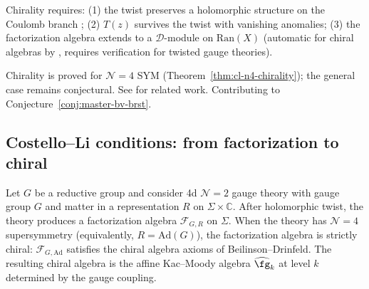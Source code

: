 \begin{remark}[Evidence]
Chirality requires: (1) the twist preserves a holomorphic structure on the Coulomb branch \cite{Gai19}; (2) $T(z)$ survives the twist with vanishing anomalies; (3) the factorization algebra extends to a $\mathcal{D}$-module on $\mathrm{Ran}(X)$ (automatic for chiral algebras by , requires verification for twisted gauge theories).
\end{remark}

\begin{remark}[Scope]
Chirality is proved for $\mathcal{N}=4$ SYM (Theorem~\ref{thm:cl-n4-chirality}); the general case remains conjectural.  See \cite{CDG20,GKW24,Zeng23} for related work.  Contributing to Conjecture~\ref{conj:master-bv-brst}.
\end{remark}

\subsection{Costello--Li conditions: from factorization to chiral}

\begin{theorem}[CL chirality for \texorpdfstring{$\mathcal{N}=4$}{N=4}; \ClaimStatusProvedElsewhere]
\label{thm:cl-n4-chirality}
\cite{CL16}
Let $G$ be a reductive group and consider 4d $\mathcal{N}=2$ gauge theory
with gauge group $G$ and matter in a representation $R$ on $\Sigma \times \mathbb{C}$.
After holomorphic twist, the theory produces a factorization algebra
$\mathcal{F}_{G,R}$ on $\Sigma$.  When the theory has $\mathcal{N}=4$
supersymmetry (equivalently, $R = \mathrm{Ad}(G)$), the factorization algebra
is strictly chiral: $\mathcal{F}_{G,\mathrm{Ad}}$ satisfies the chiral algebra
axioms of Beilinson--Drinfeld.  The resulting chiral algebra is the affine
Kac--Moody algebra $\widehat{\fg}_k$ at level $k$ determined by the gauge coupling.
\end{theorem}

